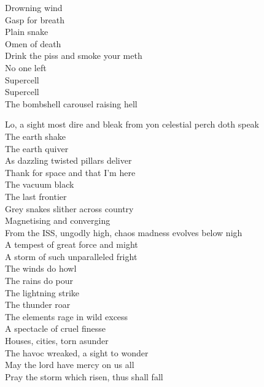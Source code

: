 Drowning wind \\
Gasp for breath \\
Plain snake \\
Omen of death \\
Drink the piss and smoke your meth \\
No one left \\

Supercell \\
Supercell \\
The bombshell carousel raising hell \\



Lo, a sight most dire and bleak from yon celestial perch doth speak \\
The earth shake \\
The earth quiver \\
As dazzling twisted pillars deliver \\

Thank  for space and that I'm here \\
The vacuum black \\
The last frontier \\
Grey snakes slither across country \\
Magnetising and converging \\

From the ISS, ungodly high, chaos madness evolves below nigh \\
A tempest of great force and might \\
A storm of such unparalleled fright \\
The winds do howl \\
The rains do pour \\
The lightning strike \\
The thunder roar \\
The elements rage in wild excess \\
A spectacle of cruel finesse \\
Houses, cities, torn asunder \\
The havoc wreaked, a sight to wonder \\
May the lord have mercy on us all \\
Pray the storm which risen, thus shall fall \\

